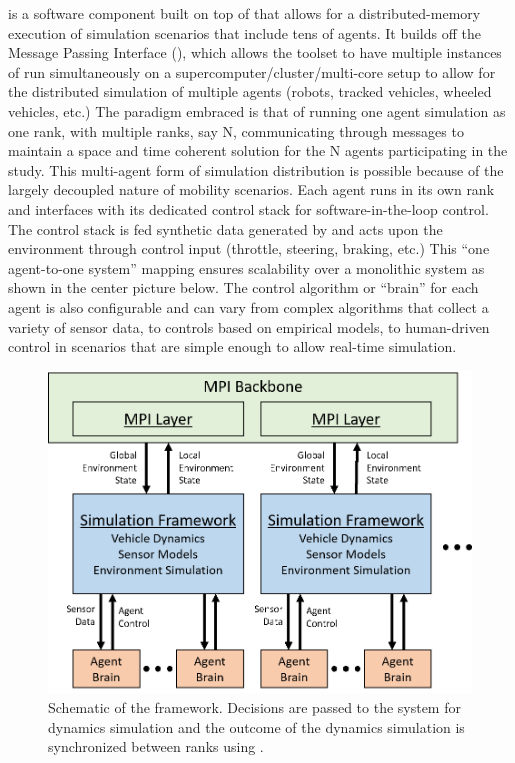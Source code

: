 \synchrono{} is a software component built on top of \chrono{} that allows for a distributed-memory execution of simulation scenarios that include tens of agents. It builds off the Message Passing Interface (\mpi{}), which allows the toolset to have multiple instances of \chrono{} run simultaneously on a supercomputer/cluster/multi-core setup to allow for the distributed simulation of multiple agents (robots, tracked vehicles, wheeled vehicles, etc.) The paradigm embraced is that of running one \chrono{} agent simulation as one \mpi{} rank, with multiple ranks, say N, communicating through messages to maintain a space and time coherent solution for the N agents participating in the study. This multi-agent form of simulation distribution is possible because of the largely decoupled nature of mobility scenarios. Each agent runs in its own rank and interfaces with its dedicated control stack for software-in-the-loop control. The control stack is fed synthetic data generated by  and acts upon the environment through  control input (throttle, steering, braking, etc.) This “one agent-to-one \chrono{} system” mapping ensures scalability over a monolithic \chrono{} system as shown in the center picture below. The control algorithm or “brain” for each agent is also configurable and can vary from complex algorithms that collect a variety of sensor data, to controls based on empirical models, to human-driven control in scenarios that are simple enough to allow real-time simulation.

\begin{figure}
	\centering
	\includegraphics[width=0.8\columnwidth]{Figs/MPI-schematic.png}
	\caption{{\small Schematic of the \synchrono{} framework. Decisions are passed to the \chrono{} system for dynamics simulation and the outcome of the dynamics simulation is synchronized between ranks using \mpi{}.}}   
	\label{fig:mpischematicold}
\end{figure}

